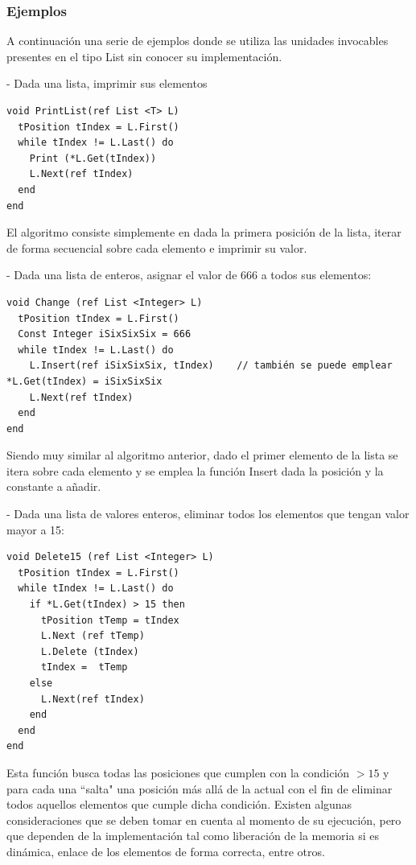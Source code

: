 \subsubsection{Ejemplos}

A continuación una serie de ejemplos donde se utiliza las unidades invocables presentes en el tipo List sin conocer su implementación.

- Dada una lista, imprimir sus elementos
\begin{lstlisting}[upquote=true, language=pseudo]
void PrintList(ref List <T> L)
  tPosition tIndex = L.First()
  while tIndex != L.Last() do
    Print (*L.Get(tIndex))
    L.Next(ref tIndex)
  end
end
\end{lstlisting}

El algoritmo consiste simplemente en dada la primera posición de la lista, iterar de forma secuencial sobre cada elemento e imprimir su valor.

- Dada una lista de enteros, asignar el valor de 666 a todos sus elementos:
\begin{lstlisting}[upquote=true, language=pseudo]
void Change (ref List <Integer> L)
  tPosition tIndex = L.First()
  Const Integer iSixSixSix = 666
  while tIndex != L.Last() do
    L.Insert(ref iSixSixSix, tIndex) 	// también se puede emplear *L.Get(tIndex) = iSixSixSix
    L.Next(ref tIndex)
  end
end
\end{lstlisting}

Siendo muy similar al algoritmo anterior, dado el primer elemento de la lista se itera sobre cada elemento y se emplea la función Insert dada la posición y la constante a añadir.

- Dada una lista de valores enteros, eliminar todos los elementos que tengan valor mayor a 15:
\begin{lstlisting}[upquote=true, language=pseudo]
void Delete15 (ref List <Integer> L)
  tPosition tIndex = L.First()
  while tIndex != L.Last() do
    if *L.Get(tIndex) > 15 then
      tPosition tTemp = tIndex
      L.Next (ref tTemp)
      L.Delete (tIndex)
      tIndex =  tTemp
    else
      L.Next(ref tIndex)
    end
  end
end
\end{lstlisting}

Esta función busca todas las posiciones que cumplen con la condición $> 15$ y para cada una ``salta" una posición más allá de la actual con el fin de eliminar todos aquellos elementos que cumple dicha condición. Existen algunas consideraciones que se deben tomar en cuenta al momento de su ejecución, pero que dependen de la implementación tal como liberación de la memoria si es dinámica, enlace de los elementos de forma correcta, entre otros.

